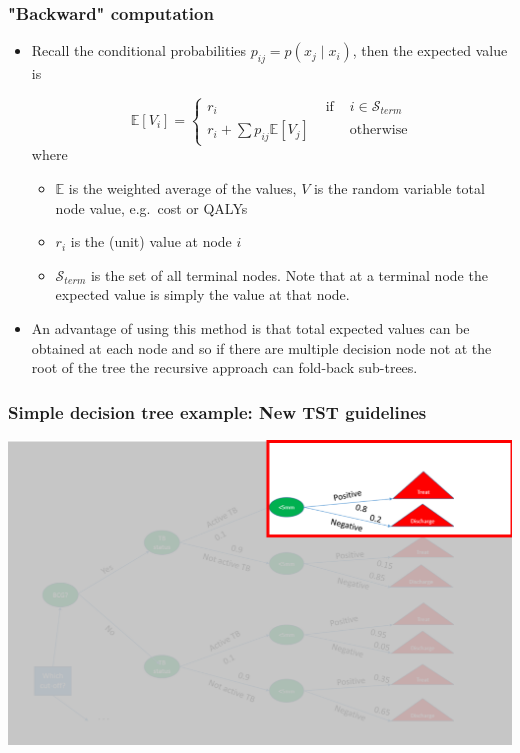 \begin{frame}
\frametitle{"Backward" computation}

\begin{itemize}
 \item Recall the conditional probabilities \(p_{ij} = p(x_j \mid x_i)\), then
the expected value is

\[
\mathbb{E}[V_i] =   \left\{
    \begin{array}{lcl}
      r_i & \mbox{ if } & i \in \mathcal{S}_{term}\\
      r_i + \sum p_{ij} \mathbb{E}[V_j] & & \mbox{otherwise}
    \end{array}
  \right.
\]
where
\begin{itemize}
\item \(\mathbb{E}\) is the weighted average of the values, \(V\) is the random variable total node value, e.g.~cost or QALYs
 \item \(r_i\) is the (unit) value at node \(i\)
 \item \(\mathcal{S}_{term}\) is the set of all terminal nodes. Note that at a terminal node the expected value is simply the value at that node.
\pause
 \end{itemize}
 \item An advantage of using this method is that total expected values can be obtained at each node and so if there are multiple decision node not at the root of the tree the recursive approach can fold-back sub-trees.
\end{itemize}

\end{frame}

\begin{frame}
\frametitle{Simple decision tree example: New TST guidelines}
 \includegraphics[width=\textwidth,height=0.8\textheight, keepaspectratio]{decision-trees/figs/folding-back1}
\end{frame}

